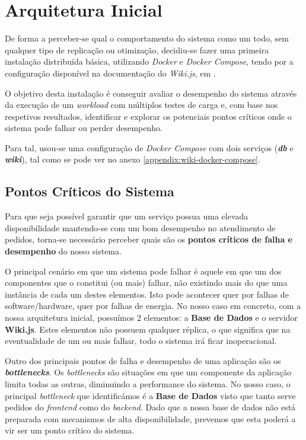 \section{Arquitetura Inicial}

De forma a perceber-se qual o comportamento do sistema como um todo, sem qualquer tipo de replicação ou otimização, decidiu-se fazer uma primeira instalação distribuída básica, utilizando \textit{Docker} e \textit{Docker Compose}, tendo por a configuração disponível na documentação do \textit{Wiki.js}, em \cite{wiki-docker}.

O objetivo desta instalação é conseguir avaliar o desempenho do sistema através da execução de um \textit{workload} com múltiplos testes de carga e, com base nos respetivos resultados, identificar e explorar os potenciais pontos críticos onde o sistema pode falhar ou perder desempenho.

Para tal, usou-se uma configuração de \textit{Docker Compose} com dois serviços (\textbf{\textit{db}} e \textbf{\textit{wiki}}), tal como se pode ver no anexo \ref{appendix:wiki-docker-compose}.

\subsection{Pontos Críticos do Sistema}

Para que seja possível garantir que um serviço possua uma elevada disponibilidade mantendo-se com um bom desempenho no atendimento de pedidos, torna-se necessário perceber quais são os \textbf{pontos críticos de falha e desempenho} do nosso sistema.

O principal cenário em que um sistema pode falhar é aquele em que um dos componentes que o constitui (ou mais) falhar, não existindo mais do que uma instância de cada um destes elementos. Isto pode acontecer quer por falhas de software/hardware, quer por falhas de energia. No nosso caso em concreto, com a nossa arquitetura inicial, possuímos 2 elementos: a \textbf{Base de Dados} e o servidor \textbf{Wiki.js}. Estes elementos não possuem qualquer réplica, o que significa que na eventualidade de um ou mais falhar, todo o sistema irá ficar inoperacional.

Outro dos principais pontos de falha e desempenho de uma aplicação são os \textbf{\textit{bottlenecks}}. Os \textit{bottlenecks} são situações em que um componente da aplicação limita todas as outras, diminuindo a performance do sistema. No nosso caso, o principal \textit{bottleneck} que identificámos é a \textbf{Base de Dados} visto que tanto serve pedidos do \textit{frontend} como do \textit{backend}. Dado que a nossa base de dados não está preparada com mecanismos de alta disponibilidade, prevemos que esta poderá a vir ser um ponto crítico do sistema.

